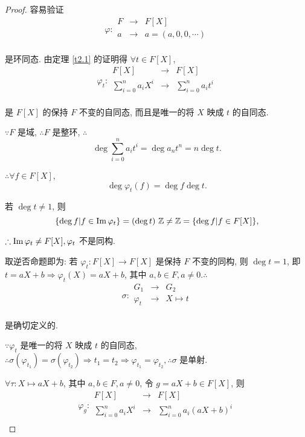 \documentclass[UTF8]{ctexart}
\begin{document}
\begin{proof}
    容易验证
    \[\varphi:\begin{array}{rcl}
        F & \to & F[X] \\
        a & \to & a=(a,0,0,\cdots) \\
    \end{array}\]

    是环同态. 由定理 \ref{t2.1} 的证明得 $\forall t\in F[X]$,
    \[\varphi_t:\begin{array}{rcl}
        F[X] & \to & F[X] \\
        \sum\limits_{i=0}^{n}a_iX^i & \to & \sum\limits_{i=0}^{n}a_it^i \\
    \end{array}\]

    是 $F[X]$ 的保持 $F$ 不变的自同态, 而且是唯一的将 $X$ 映成 $t$ 的自同态.

    $\because F$ 是域, $\therefore F$ 是整环, $\therefore$
    \[\deg\sum\limits_{i=0}^{n}a_it^i=\deg a_nt^n=n\deg t.\]

    $\therefore\forall f\in F[X]$,
    \[\deg\varphi_t(f)=\deg f\deg t.\]

    若 $\deg t\neq1$, 则
    \[\{\deg f|f\in\im \varphi_t\}=(\deg t)\ \mathbb{Z}\neq\mathbb{Z}=\{\deg f|f\in F[X]\},\]

    $\therefore\operatorname{Im} \varphi_t\neq F[X],\varphi_t$ 不是同构.

    取逆否命题即为: 若 $\varphi_t:F[X]\to F[X]$ 是保持 $F$ 不变的同构, 则 $\deg t=1$, 即 $t=aX+b\Rightarrow\varphi_t(X)=aX+b$, 其中 $a,b\in F,a\neq0.\therefore$
    \[\sigma:\begin{array}{rcl}
        G_1 & \to & G_2 \\
        \varphi_t & \to & X\mapsto t \\
    \end{array}\]

    是确切定义的.

    $\because\varphi_t$ 是唯一的将 $X$ 映成 $t$ 的自同态, $\therefore\sigma(\varphi_{t_1})=\sigma(\varphi_{t_2})\Rightarrow t_1=t_2\Rightarrow\varphi_{t_1}=\varphi_{t_2},\therefore\sigma$ 是单射.

    $\forall\tau:X\mapsto aX+b$, 其中 $a,b\in F,a\neq0$, 令 $g=aX+b\in F[X]$, 则
    \[\varphi_g:\begin{array}{rcl}
        F[X] & \to & F[X] \\
        \sum\limits_{i=0}^{n}a_iX^i & \to & \sum\limits_{i=0}^{n}a_i(aX+b)^i \\
    \end{array}\]


\end{proof}
\end{document}
